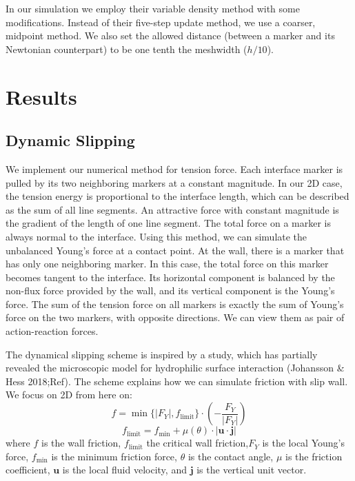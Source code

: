 \documentclass{jfm}
\begin{document}
In our simulation we employ their variable density method with some modifications. Instead of their five-step update method, we use a coarser, midpoint method. We also set the allowed distance (between a marker and its Newtonian counterpart) to be one tenth the meshwidth ($h/10$). 

\section{Results}\label{sec:results}
\subsection{Dynamic Slipping}\label{sec:results}

We implement our numerical method for tension force. Each interface marker is pulled by its two neighboring markers at a constant magnitude. In our 2D case, the tension energy is proportional to the interface length, which can be described as the sum of all line segments. An attractive force with constant magnitude is the gradient of the length of one line segment. The total force on a marker is always normal to the interface. Using this method, we can simulate the unbalanced Young's force at a contact point. At the wall, there is a marker that has only one neighboring marker. In this case, the total force on this marker becomes tangent to the interface. Its horizontal component is balanced by the non-flux force provided by the wall, and its vertical component is the Young's force. The sum of the tension force on all markers is exactly the sum of Young's force on the two markers, with opposite directions. We can view them as pair of action-reaction forces.

The dynamical slipping scheme is inspired by a study, which has partially revealed the microscopic model for hydrophilic surface interaction (Johansson \& Hess 2018;Ref). The scheme explains how we can simulate friction with slip wall. We focus on 2D from here on:
\begin{equation}
    f=\min\{|F_Y|,f_\text{limit}\}\cdot\left(-\frac{F_Y}{|F_Y|}\right)
\end{equation}
\begin{equation}
    f_\text{limit}=f_{\min}+\mu(\theta)\cdot|\boldsymbol{u}\cdot\boldsymbol{j}|
\end{equation}
where $f$ is the wall friction, $f_\text{limit}$ the critical wall friction,$F_Y$ is the local Young's force, $f_{\min}$ is the minimum friction force, $\theta$ is the contact angle, $\mu$ is the friction coefficient, $\boldsymbol{u}$ is the local fluid velocity, and $\boldsymbol{j}$ is the vertical unit vector.
\end{document}
